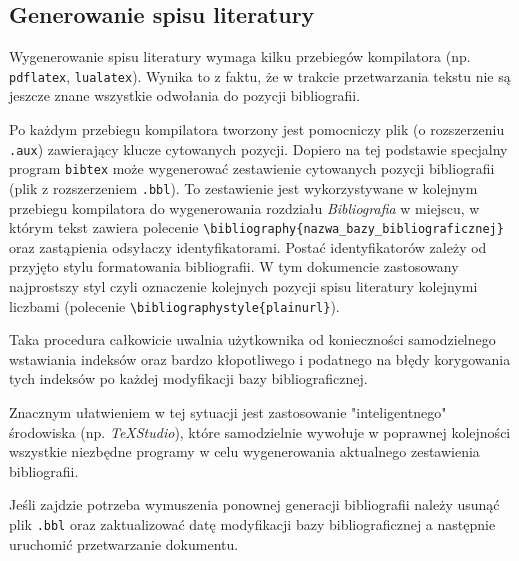 \subsection{Generowanie spisu literatury}
Wygenerowanie spisu literatury wymaga kilku przebiegów kompilatora (np. \texttt{pdflatex}, \texttt{lualatex}). Wynika to z faktu, że w trakcie przetwarzania  tekstu nie są jeszcze znane wszystkie odwołania do pozycji bibliografii. 

Po każdym przebiegu kompilatora tworzony jest pomocniczy plik (o rozszerzeniu \texttt{.aux}) zawierający klucze cytowanych pozycji. Dopiero na tej podstawie specjalny program \texttt{bibtex} może wygenerować zestawienie cytowanych pozycji bibliografii (plik z rozszerzeniem \texttt{.bbl}). To zestawienie jest wykorzystywane w kolejnym przebiegu kompilatora do wygenerowania rozdziału \textit{Bibliografia} w miejscu, w którym tekst zawiera polecenie \texttt{\textbackslash bibliography\{nazwa\_bazy\_bibliograficznej\}} oraz zastąpienia odsyłaczy identyfikatorami. Postać identyfikatorów zależy od przyjęto stylu formatowania bibliografii. W tym dokumencie zastosowany najprostszy styl czyli oznaczenie kolejnych pozycji spisu literatury kolejnymi liczbami (polecenie \texttt{\textbackslash bibliographystyle\{plainurl\}}).

Taka procedura całkowicie uwalnia użytkownika od konieczności samodzielnego wstawiania indeksów oraz bardzo kłopotliwego i podatnego na błędy korygowania tych indeksów po każdej modyfikacji bazy bibliograficznej.    

Znacznym ułatwieniem w tej sytuacji jest zastosowanie "inteligentnego" środowiska (np. \mbox{\textit{TeXStudio}}), które samodzielnie wywołuje w poprawnej kolejności wszystkie niezbędne programy w celu wygenerowania aktualnego zestawienia bibliografii. 

Jeśli zajdzie potrzeba wymuszenia ponownej generacji bibliografii należy usunąć plik \texttt{.bbl} oraz zaktualizować datę modyfikacji bazy bibliograficznej a następnie  uruchomić przetwarzanie dokumentu.



